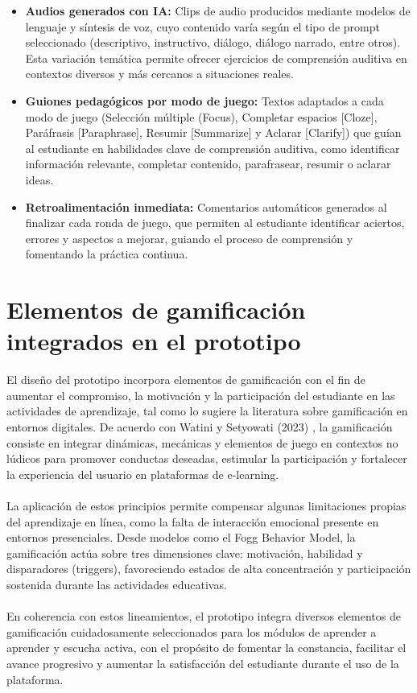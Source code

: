 \begin{itemize}

\item \textbf{Audios generados con IA:} Clips de audio producidos mediante modelos de lenguaje y síntesis de voz, cuyo contenido varía según el tipo de prompt seleccionado (descriptivo, instructivo, diálogo, diálogo narrado, entre otros). Esta variación temática permite ofrecer ejercicios de comprensión auditiva en contextos diversos y más cercanos a situaciones reales.

\item \textbf{Guiones pedagógicos por modo de juego:} Textos adaptados a cada modo de juego (Selección múltiple (Focus), Completar espacios [Cloze], Paráfrasis [Paraphrase], Resumir [Summarize] y Aclarar [Clarify]) que guían al estudiante en habilidades clave de comprensión auditiva, como identificar información relevante, completar contenido, parafrasear, resumir o aclarar ideas.


\item \textbf{Retroalimentación inmediata:} Comentarios automáticos generados al finalizar cada ronda de juego, que permiten al estudiante identificar aciertos, errores y aspectos a mejorar, guiando el proceso de comprensión y fomentando la práctica continua.

\end{itemize}

\section{Elementos de gamificación integrados en el prototipo}
El diseño del prototipo incorpora elementos de gamificación con el fin de aumentar el compromiso, la motivación y la participación del estudiante en las actividades de aprendizaje, tal como lo sugiere la literatura sobre gamificación en entornos digitales. De acuerdo con Watini y Setyowati (2023) \cite{watini2023gamification}, la gamificación consiste en integrar dinámicas, mecánicas y elementos de juego en contextos no lúdicos para promover conductas deseadas, estimular la participación y fortalecer la experiencia del usuario en plataformas de e-learning.
\\
\\
La aplicación de estos principios permite compensar algunas limitaciones propias del aprendizaje en línea, como la falta de interacción emocional presente en entornos presenciales. Desde modelos como el Fogg Behavior Model, la gamificación actúa sobre tres dimensiones clave: motivación, habilidad y disparadores (triggers), favoreciendo estados de alta concentración y participación sostenida durante las actividades educativas.
\\
\\
En coherencia con estos lineamientos, el prototipo integra diversos elementos de gamificación cuidadosamente seleccionados para los módulos de aprender a aprender y escucha activa, con el propósito de fomentar la constancia, facilitar el avance progresivo y aumentar la satisfacción del estudiante durante el uso de la plataforma.

